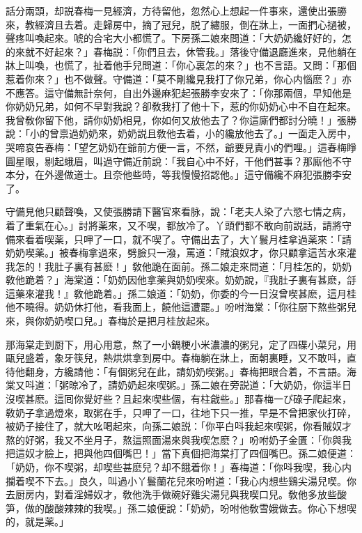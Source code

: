 話分兩頭，却説春梅一見經濟，方待留他，忽然心上想起一件事來，還使出張勝來，教經濟且去着。走歸房中，摘了冠兒，脱了繡服，倒在牀上，一面捫心撾被，聲疼叫喚起來。唬的合宅大小都慌了。下房孫二娘來問道：「大奶奶纔好好的，怎的來就不好起來？」春梅説：「你們且去，休管我。」落後守備退廳進來，見他躺在牀上叫喚，也慌了，扯着他手兒問道：「你心裏怎的來？」也不言語。又問：「那個惹着你來？」也不做聲。守備道：「莫不剛纔見我打了你兄弟，你心内惱麽？」亦不應答。這守備無計奈何，自出外邊麻犯起張勝李安來了：「你那兩個，早知他是你奶奶兄弟，如何不早對我說？卻敎我打了他十下，惹的你奶奶心中不自在起來。我曾敎你留下他，請你奶奶相見，你如何又放他去了？你這廝們都討分曉！」張勝說：「小的曾禀過奶奶來，奶奶説且敎他去着，小的纔放他去了。」一面走入房中，哭啼哀告春梅：「望乞奶奶在爺前方便一言，不然，爺要見責小的們哩。」這春梅睜圓星眼，剔起蛾眉，叫過守備近前說：「我自心中不好，干他們甚事？那廝他不守本分，在外邊做道士。且奈他些時，等我慢慢招認他。」這守備纔不麻犯張勝李安了。

守備見他只顧聲喚，又使張勝請下醫官來看脉，說：「老夫人染了六慾七情之病，着了重氣在心。」討將薬來，又不喫，都放冷了。丫頭們都不敢向前説話，請將守備來看着喫薬，只呷了一口，就不喫了。守備出去了，大丫鬟月桂拿過薬來：「請奶奶喫薬。」被春梅拿過來，劈臉只一潑，罵道：「賊浪奴才，你只顧拿這苦水來灌我怎的！我肚子裏有甚麽！」敎他跪在面前。孫二娘走來問道：「月桂怎的，奶奶敎他跪着？」海棠道：「奶奶因他拿薬與奶奶喫來。奶奶說，『我肚子裏有甚麽，㧱這藥來灌我！』敎他跪着。」孫二娘道：「奶奶，你委的今一日沒曾喫甚麽，這月桂他不曉得。奶奶休打他，看我面上，饒他這遭罷。」吩咐海棠：「你往厨下熬些粥兒來，與你奶奶喫口兒。」春梅於是把月桂放起來。

那海棠走到厨下，用心用意，熬了一小鍋粳小米濃濃的粥兒，定了四碟小菜兒，用甌兒盛着，象牙筷兒，熱烘烘拿到房中。春梅躺在牀上，面朝裏睡，又不敢呌，直待他翻身，方纔請他：「有個粥兒在此，請奶奶喫粥。」春梅把眼合着，不言語。海棠又呌道：「粥晾冷了，請奶奶起來喫粥。」孫二娘在旁説道：「大奶奶，你這半日沒喫甚麽。這囘你覺好些？且起來喫些個，有柱戧些。」那春梅一ぴ碌子爬起來，敎奶子拿過燈來，取粥在手，只呷了一口，往地下只一推，早是不曾把家伙打碎，被奶子接住了，就大吆喝起來，向孫二娘説：「你平白呌我起來喫粥，你看賊奴才熬的好粥，我又不坐月子，熬這照面湯來與我喫怎麽？」吩咐奶子金匱：「你與我把這奴才臉上，把與他四個嘴巴！」當下真個把海棠打了四個嘴巴。孫二娘便道：「奶奶，你不喫粥，却喫些甚麽兒？却不餓着你！」春梅道：「你呌我喫，我心内攔着喫不下去。」良久，叫過小丫鬟蘭花兒來吩咐道：「我心内想些鷄尖湯兒喫。你去厨房内，對着淫婦奴才，敎他洗手做碗好雞尖湯兒與我喫口兒。敎他多放些酸笋，做的酸酸辣辣的我喫。」孫二娘便說：「奶奶，吩咐他敎雪娥做去。你心下想喫的，就是薬。」

